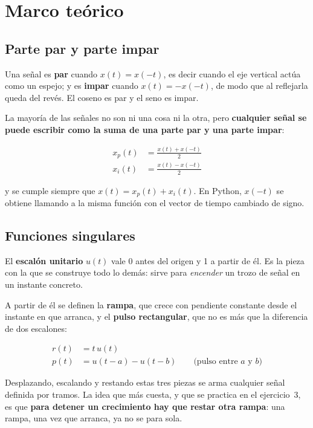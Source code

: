\documentclass[11pt,a4paper]{article}
\begin{document}
\FloatBarrier
\section{Marco teórico}

\subsection{Parte par y parte impar}
Una señal es \textbf{par} cuando $x(t) = x(-t)$, es decir cuando el eje vertical actúa
como un espejo; y es \textbf{impar} cuando $x(t) = -x(-t)$, de modo que al reflejarla
queda del revés. El coseno es par y el seno es impar.

La mayoría de las señales no son ni una cosa ni la otra, pero \textbf{cualquier señal se
puede escribir como la suma de una parte par y una parte impar}:

\begin{align}
  x_p(t) &= \frac{x(t) + x(-t)}{2} \label{eq:par}\\[4pt]
  x_i(t) &= \frac{x(t) - x(-t)}{2} \label{eq:impar}
\end{align}

\noindent y se cumple siempre que $x(t) = x_p(t) + x_i(t)$. En Python, $x(-t)$ se obtiene
llamando a la misma función con el vector de tiempo cambiado de signo.

\subsection{Funciones singulares}
El \textbf{escalón unitario} $u(t)$ vale \num{0} antes del origen y \num{1} a partir de
él. Es la pieza con la que se construye todo lo demás: sirve para \emph{encender} un
trozo de señal en un instante concreto.

A partir de él se definen la \textbf{rampa}, que crece con pendiente constante desde el
instante en que arranca, y el \textbf{pulso rectangular}, que no es más que la diferencia
de dos escalones:

\begin{align}
  r(t) &= t\,u(t) \\
  p(t) &= u(t-a) - u(t-b) \qquad \text{(pulso entre $a$ y $b$)}
\end{align}

Desplazando, escalando y restando estas tres piezas se arma cualquier señal definida por
tramos. La idea que más cuesta, y que se practica en el ejercicio~3, es que
\textbf{para detener un crecimiento hay que restar otra rampa}: una rampa, una vez que
arranca, ya no se para sola.
\end{document}
